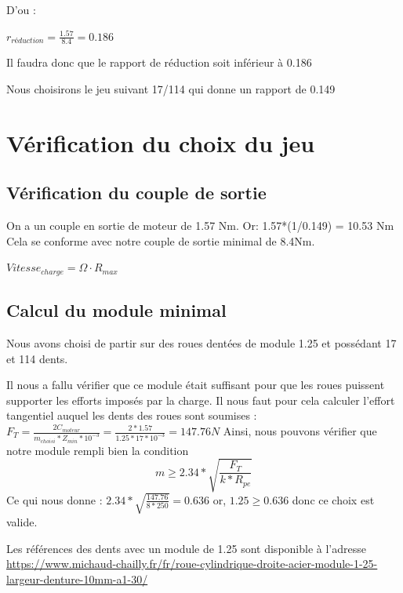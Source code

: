 D'ou : \newline

$ r_{réduction} = \frac{1.57}{8.4} = 0.186$

Il faudra donc que le rapport de réduction soit inférieur à 0.186

Nous choisirons le jeu suivant 17/114 qui donne un rapport de 0.149

\sskip
\section{Vérification du choix du jeu}
\subsection{Vérification du couple de sortie}
On a un couple en sortie de moteur de 1.57 Nm.
Or: 1.57*(1/0.149) = 10.53 Nm\n
Cela se conforme avec notre couple de sortie minimal de 8.4Nm.

$ Vitesse_{charge} = \Omega \cdot R_{max}$




\subsection{Calcul du module minimal}



Nous avons choisi de partir sur des roues dentées de module 1.25 et possédant 17 et 114 dents.

Il nous a fallu vérifier que ce module était suffisant pour que les roues puissent supporter les efforts imposés par la charge. \newline
Il nous faut pour cela calculer l'effort tangentiel auquel les dents des roues sont soumises : $ F_T = \frac{2C_{moteur}}{m_{choisi}*Z_{min}*10^{-3}} = \frac{2*1.57}{1.25*17*10^{-3}} = 147.76 N$\newline
Ainsi, nous pouvons vérifier que notre module rempli bien la condition $$ m \geq 2.34*\sqrt{\frac{F_T}{k*R_{pe}}} $$
Ce qui nous donne : $ 2.34 * \sqrt{\frac{147.76}{8*250}} = 0.636 $ or, $ 1.25 \geq 0.636 $ donc ce choix est valide.


Les références des dents avec un module de 1.25 sont disponible à l'adresse \newline
\url{https://www.michaud-chailly.fr/fr/roue-cylindrique-droite-acier-module-1-25-largeur-denture-10mm-a1-30/}


